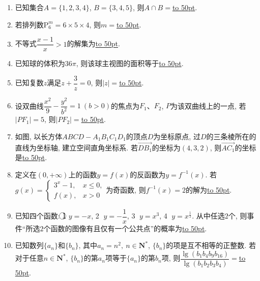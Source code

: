\documentclass[10pt,a4paper]{article}
\newcommand{\blank}[1]{\underline{\hbox to #1pt{}}}
\begin{document}
\begin{enumerate}[1.]
\item 已知集合$A=\{1,2,3,4\}$, $B=\{3,4,5\}$, 则$A\cap B=$\blank{50}.
\item 若排列数$\mathrm{P}_6^m=6\times 5\times 4$, 则$m=$\blank{50}.
\item 不等式$\dfrac{x-1}{x}>1$的解集为\blank{50}.
\item 已知球的体积为$36\pi$, 则该球主视图的面积等于\blank{50}.
\item 已知复数$z$满足$z+\dfrac{3}{z}=0$, 则$|z|=$\blank{50}.
\item 设双曲线$\dfrac{x^2}{9}-\dfrac{y^2}{b^2}=1 \ (b>0)$的焦点为$F_1$、$F_2$, $P$为该双曲线上的一点, 若$|PF_1|=5$, 则$|PF_2|=$\blank{50}.
\item 如图, 以长方体$ABCD-A_1B_1C_1D_1$的顶点$D$为坐标原点, 过$D$的三条棱所在的直线为坐标轴, 建立空间直角坐标系. 若$\overrightarrow{DB_1}$的坐标为$(4,3,2)$, 则$\overrightarrow{AC_1}$的坐标是\blank{50}.
\begin{center}
\end{center}
\item 定义在$(0,+\infty)$上的函数$y=f(x)$的反函数为$y=f^{-1}(x)$. 若$g(x)=\begin{cases}3^x-1, & x\le 0,\\ f(x), & x>0\end{cases}$为奇函数, 则$f^{-1}(x)=2$的解为\blank{50}.
\item 已知四个函数: \textcircled{1} $y=-x$, \textcircled{2} $y=-\dfrac{1}{x}$, \textcircled{3} $y=x^3$, \textcircled{4} $y=x^{\frac{1}{2}}$. 从中任选$2$个, 则事件``所选$2$个函数的图像有且仅有一个公共点''的概率为\blank{50}.
\item 已知数列$\{a_n\}$和$\{b_n\}$, 其中$a_n=n^2, \ n\in \mathbf{N}^*$, $\{b_n\}$的项是互不相等的正整数. 若对于任意$n\in \mathbf{N}^*$, $\{b_n\}$的第$a_n$项等于$\{a_n\}$的第$b_n$项, 则$\dfrac{\lg (b_1b_4b_9b_{16})}{\lg(b_1b_2b_3b_4)}=$\blank{50}.

\end{enumerate}
\end{document}
